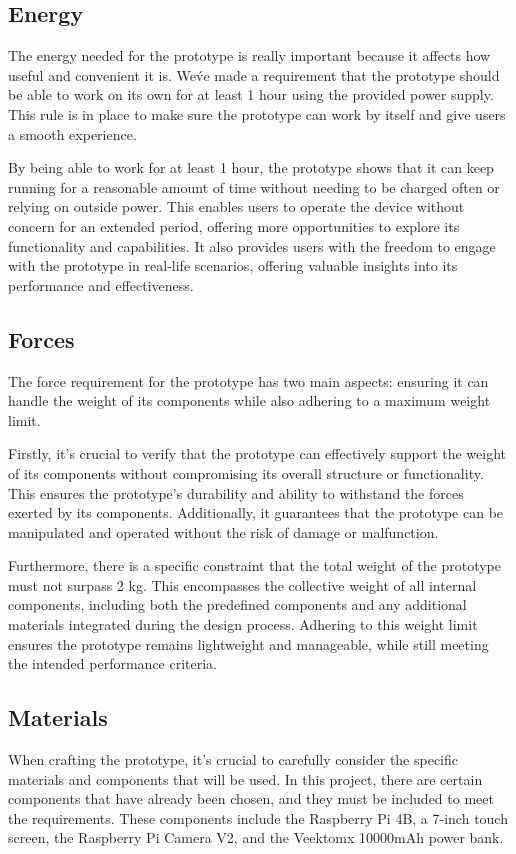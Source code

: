 \subsection{Energy}
The energy needed for the prototype is really important because it affects how useful and convenient it is. We\'ve made a requirement that the prototype should be able to work on its own for at least 1 hour using the provided power supply. This rule is in place to make sure the prototype can work by itself and give users a smooth experience.

By being able to work for at least 1 hour, the prototype shows that it can keep running for a reasonable amount of time without needing to be charged often or relying on outside power. This enables users to operate the device without concern for an extended period, offering more opportunities to explore its functionality and capabilities. It also provides users with the freedom to engage with the prototype in real-life scenarios, offering valuable insights into its performance and effectiveness.

\subsection{Forces}
The force requirement for the prototype has two main aspects: ensuring it can handle the weight of its components while also adhering to a maximum weight limit.

Firstly, it's crucial to verify that the prototype can effectively support the weight of its components without compromising its overall structure or functionality. This ensures the prototype's durability and ability to withstand the forces exerted by its components. Additionally, it guarantees that the prototype can be manipulated and operated without the risk of damage or malfunction.

Furthermore, there is a specific constraint that the total weight of the prototype must not surpass 2 kg. This encompasses the collective weight of all internal components, including both the predefined components and any additional materials integrated during the design process. Adhering to this weight limit ensures the prototype remains lightweight and manageable, while still meeting the intended performance criteria.

\subsection{Materials}
When crafting the prototype, it's crucial to carefully consider the specific materials and components that will be used. In this project, there are certain components that have already been chosen, and they must be included to meet the requirements. These components include the Raspberry Pi 4B, a 7-inch touch screen, the Raspberry Pi Camera V2, and the Veektomx 10000mAh power bank.

